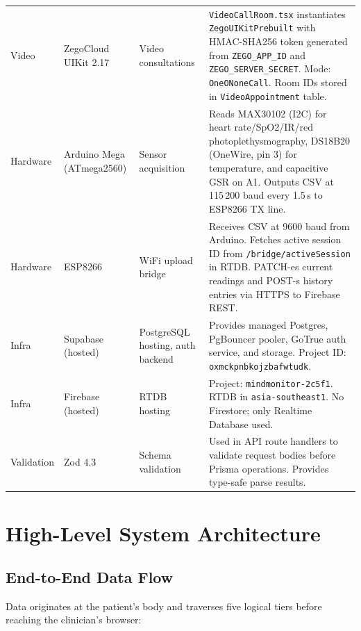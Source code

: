 \documentclass[12pt,a4paper]{report}
\begin{document}
\begin{longtable}{L{2.4cm} L{3.2cm} L{3.0cm} L{6.2cm}}
  Video & ZegoCloud UIKit 2.17 & Video consultations &
    \texttt{VideoCallRoom.tsx} instantiates \texttt{ZegoUIKitPrebuilt}
    with HMAC-SHA256 token generated from \texttt{ZEGO\_APP\_ID} and
    \texttt{ZEGO\_SERVER\_SECRET}. Mode: \texttt{OneONoneCall}.
    Room IDs stored in \texttt{VideoAppointment} table. \\

  Hardware & Arduino Mega (ATmega2560) & Sensor acquisition &
    Reads MAX30102 (I2C) for heart rate/SpO2/IR/red photoplethysmography,
    DS18B20 (OneWire, pin 3) for temperature, and capacitive GSR on A1.
    Outputs CSV at 115\,200 baud every 1.5\,s to ESP8266 TX line. \\

  Hardware & ESP8266 & WiFi upload bridge &
    Receives CSV at 9600 baud from Arduino. Fetches active session ID
    from \texttt{/bridge/activeSession} in RTDB. PATCH-es current
    readings and POST-s history entries via HTTPS to Firebase REST. \\

  Infra & Supabase (hosted) & PostgreSQL hosting, auth backend &
    Provides managed Postgres, PgBouncer pooler, GoTrue auth service,
    and storage. Project ID: \texttt{oxmckpnbkojzbafwtudk}. \\

  Infra & Firebase (hosted) & RTDB hosting &
    Project: \texttt{mindmonitor-2c5f1}. RTDB in
    \texttt{asia-southeast1}. No Firestore; only Realtime Database used. \\

  Validation & Zod 4.3 & Schema validation &
    Used in API route handlers to validate request bodies before
    Prisma operations. Provides type-safe parse results. \\
\end{longtable}

\chapter{High-Level System Architecture}
\label{ch:hla}

\section{End-to-End Data Flow}

Data originates at the patient's body and traverses five logical tiers
before reaching the clinician's browser:
\end{document}

